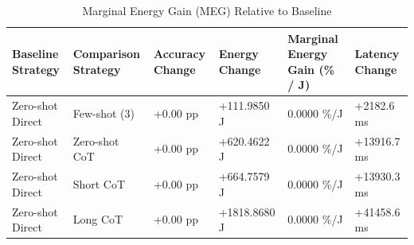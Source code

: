 \begin{table}
\caption{Marginal Energy Gain (MEG) Relative to Baseline}
\label{tab:marginal_energy_gain}
\begin{tabular}{llllll}
\toprule
Baseline Strategy & Comparison Strategy & Accuracy Change & Energy Change & Marginal Energy Gain (\% / J) & Latency Change \\
\midrule
Zero-shot Direct & Few-shot (3) & +0.00 pp & +111.9850 J & 0.0000 \%/J & +2182.6 ms \\
Zero-shot Direct & Zero-shot CoT & +0.00 pp & +620.4622 J & 0.0000 \%/J & +13916.7 ms \\
Zero-shot Direct & Short CoT & +0.00 pp & +664.7579 J & 0.0000 \%/J & +13930.3 ms \\
Zero-shot Direct & Long CoT & +0.00 pp & +1818.8680 J & 0.0000 \%/J & +41458.6 ms \\
\bottomrule
\end{tabular}
\end{table}
